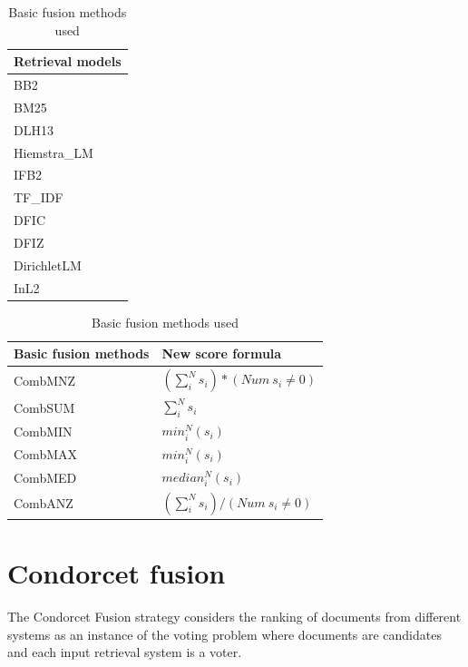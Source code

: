 	\begin{table} [H]
		\begin{minipage} {0.2\linewidth}
			\centering
			\begin{tabular}{l}
				\toprule
				\textbf{Retrieval models} \\ \toprule
				BB2 \\
				BM25 \\
				DLH13 \\
				Hiemstra\_LM \\
				IFB2 \\
				TF\_IDF \\
				DFIC \\
				DFIZ \\
				DirichletLM \\
				InL2 \\
				\bottomrule
			\end{tabular}
			\caption{Retrieval models used}
			\label{tab:10Mod}
		\end{minipage}		
		\begin{minipage} {0.8\linewidth}
			\centering
			{\def\arraystretch{2}\tabcolsep=10pt
			\begin{tabular}{l p{5cm}}
				\toprule
				\textbf{Basic fusion methods} & \textbf{New score formula} \\ \toprule
				CombMNZ & $(\sum_{i}^{N} s_{i})*(Num~s_{i}\ne 0)$ \\ \hline
				CombSUM & $ \sum_{i}^{N} s_{i} $ \\ \hline
				CombMIN & $ min_{i}^{N} {(s_{i})} $ \\ \hline
				CombMAX & $ min_{i}^{N} {(s_{i})} $  \\ \hline
				CombMED & $ median_{i}^{N} {(s_{i})} $ \\ \hline
				CombANZ & $  (\sum_{i}^{N} s_{i}) /
							(Num ~ s_{i} \ne 0)$   \\ 
							\bottomrule
			\end{tabular}}
			\caption{Basic fusion methods used }
			\label{tab:6Fus}
		\end{minipage}		
	\end{table}
    
    \section{Condorcet fusion}
    The Condorcet Fusion strategy considers the ranking of documents from different systems as an instance of the voting problem where documents are candidates and each input retrieval system is a voter.
    
